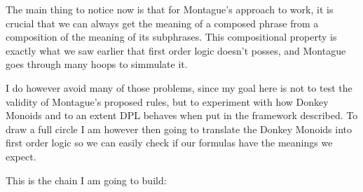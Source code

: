 \documentclass[12pt]{article}
\begin{document}
The main thing to notice now is that for Montague's approach to work, it is crucial that we can always get the meaning of a composed phrase from a composition of the meaning of its subphrases. This compositional property is exactly what we saw earlier that first order logic doesn't posses, and Montague goes through many hoops to simmulate it.

I do however avoid many of those problems, since my goal here is not to test the validity of Montague's proposed rules, but to experiment with how Donkey Monoids and to an extent DPL behaves when put in the framework described. To draw a full circle I am however then going to translate the Donkey Monoids into first order logic so we can easily check if our formulas have the meanings we expect.

This is the chain I am going to build:
\end{document}
